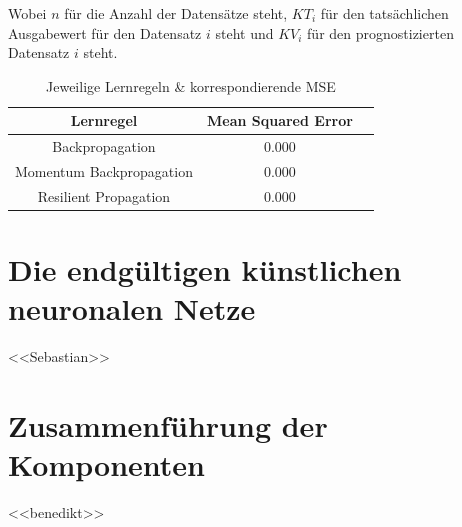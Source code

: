 Wobei $n$ für die Anzahl der Datensätze steht, $KT_i$ für den tatsächlichen Ausgabewert für den Datensatz $i$ steht und $KV_i$ für den prognostizierten Datensatz $i$ steht.





\begin{table}[H]
  \centering
  \begin{tabular}{|c|c|c|}
  \hline 
  \rule[0ex]{0pt}{2.5ex} Lernregel & Mean Squared Error \\ 
  \hline 
  \rule[0ex]{0pt}{2.5ex} Backpropagation & 0.000 \\ 
  \hline 
  \rule[0ex]{0pt}{2.5ex} Momentum Backpropagation & 0.000\\ 
  \hline 
  \rule[0ex]{0pt}{2.5ex} Resilient Propagation & 0.000 \\ 
  \hline 
  \end{tabular} 
  \caption{Jeweilige Lernregeln \& korrespondierende MSE}
  \label{tab:tab3}
\end{table}



\section{Die endgültigen künstlichen neuronalen Netze}
<<Sebastian>> \Blindtext
\section{Zusammenführung der Komponenten}
<<benedikt>> \Blindtext

